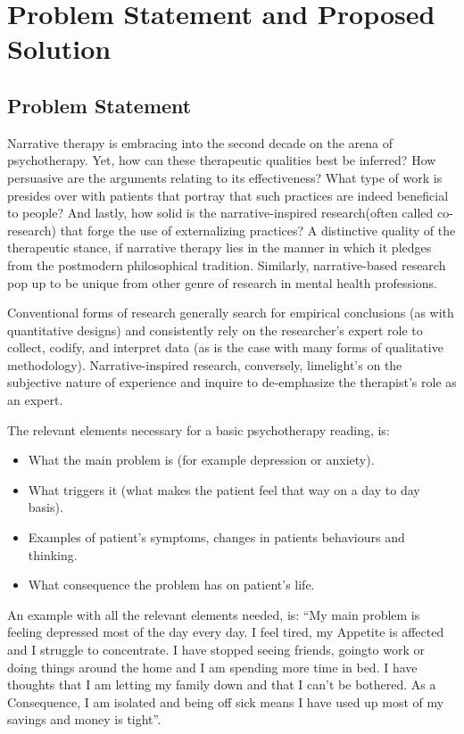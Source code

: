 \chapter{Problem Statement and Proposed Solution}

\pagebreak

\section{Problem Statement}

Narrative therapy is embracing into the second decade on the arena of psychotherapy. Yet, how can these therapeutic qualities best be inferred? How persuasive are the arguments relating to its effectiveness? What type of work is presides over with patients that portray that such practices are indeed beneficial to people? And lastly, how solid is the narrative-inspired research(often called co-research) that forge the use of externalizing practices? A distinctive quality of the therapeutic stance, if narrative therapy lies in the manner in which it pledges from the postmodern philosophical tradition. Similarly, narrative-based research pop up to be unique from other genre of research in mental health professions.

Conventional forms of research generally search for empirical conclusions (as with quantitative designs) and consistently rely on the researcher’s expert role to collect, codify, and interpret data (as is the case with many forms of qualitative methodology). Narrative-inspired research, conversely, limelight’s on the subjective nature of experience and inquire to de-emphasize the therapist’s role as an expert.

The relevant elements necessary for a basic psychotherapy reading, is:
\begin{itemize}
    \item What the main problem is (for example depression or anxiety).
    \item What triggers it (what makes the patient feel that way on a day to day basis).
    \item Examples of patient's symptoms, changes in patients behaviours and thinking.
    \item What consequence the problem has on patient's life.
\end{itemize}

An example with all the relevant elements needed, is:
``My main problem is feeling depressed most of the day every day. I feel tired, my Appetite is affected and I struggle to concentrate. I have stopped seeing friends, goingto work or doing things around the home and I am spending more time in bed. I have thoughts that I am letting my family down and that I can't be bothered. As a Consequence, I am isolated and being off sick means I have used up most of my savings and money is tight''.

